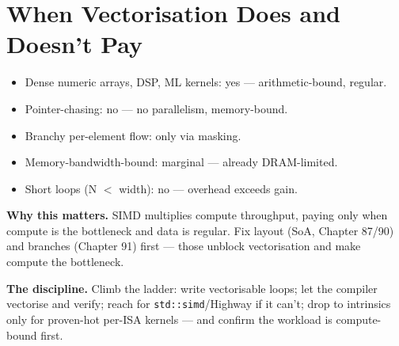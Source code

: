 \section{When Vectorisation Does and Doesn't Pay}
\begin{itemize}
\item Dense numeric arrays, DSP, ML kernels: yes --- arithmetic-bound, regular.
\item Pointer-chasing: no --- no parallelism, memory-bound.
\item Branchy per-element flow: only via masking.
\item Memory-bandwidth-bound: marginal --- already DRAM-limited.
\item Short loops (N $<$ width): no --- overhead exceeds gain.
\end{itemize}

\textbf{Why this matters.} SIMD multiplies compute throughput, paying only when compute is the bottleneck and data is regular. Fix layout (SoA, Chapter 87/90) and branches (Chapter 91) first --- those unblock vectorisation and make compute the bottleneck.

\textbf{The discipline.} Climb the ladder: write vectorisable loops; let the compiler vectorise and verify; reach for \texttt{std::simd}/Highway if it can't; drop to intrinsics only for proven-hot per-ISA kernels --- and confirm the workload is compute-bound first.
